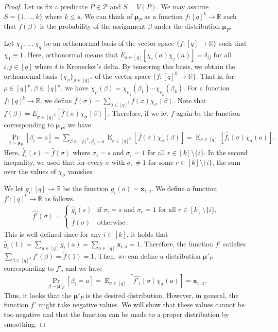 \documentclass[letterpaper, 11pt]{article}
\newcommand{\calP}{\mathcal{P}}
\newcommand{\bbR}{\mathbb{R}}
\newcommand{\bix}{\boldsymbol{x}}
\newcommand{\bimu}{\boldsymbol{\mu}}
\newcommand{\E}{\mathop{\mathrm{E}}}
\begin{document}
\begin{proof}
  Let us fix a predicate $P\in \calP$ and $S=V(P)$.
  We may assume $S=\{1,\ldots,k\}$ where $k\leq s$.
  We can think of $\bimu_P$ as a function $f:[q]^k\to \bbR$ such that $f(\beta)$ is the probability of the assignment $\beta$ under the distribution $\bimu_P$.

  Let $\chi_1,\ldots,\chi_q$ be an orthonormal basis of the vector space $\{f:[q]\to \bbR\}$ such that $\chi_1\equiv 1$.
  Here, orthonormal means that $E_{a\in[q]}[\chi_i(a)\chi_j(a)]=\delta_{ij}$ for all $i,j\in [q]$ where $\delta$ is Kronecker's delta.
  By tensoring this basis, 
  we obtain the orthonormal basis $\{\chi_\rho\}_{\rho\in[q]^k}$ of the vector space $\{f:[q]^k\to \bbR\}$.
  That is,
  for $\rho\in [q]^k, \beta\in [q]^k$,
  we have $\chi_{\rho}(\beta)=\chi_{\rho_1}(\beta_1)\cdots \chi_{\rho_k}(\beta_k)$.
  For a function $f:[q]^k\to \bbR$,
  we define $\hat{f}(\sigma)=\sum_{\beta\in [q]^k}f(x)\chi_{\sigma}(\beta)$.
  Note that $f(\beta)=E_{\sigma\in [q]^k}[\hat{f}(\sigma)\chi_{\sigma}(\beta)]$.
  Therefore, 
  if we let $f$ again be the function corresponding to $\bimu_P$, 
  we have
  \begin{eqnarray*}
    \Pr_{\beta\sim \bimu_P}[\beta_i=a]
    =
    \sum_{\beta\in [q]^k, \beta_i=a}\E_{\sigma\in [q]^k}\left[\widehat{f}(\sigma)\chi_\sigma(\beta)\right]
    =
    \E_{\sigma\in [q]}\left[\widehat{f_i}(\sigma)\chi_\sigma(a)\right].
  \end{eqnarray*}
  Here, $\widehat{f}_i(s)=\widehat{f}(\sigma)$ where $\sigma_i=s$ and $\sigma_r=1$ for all $r\in [k]\setminus\{i\}$.
  In the second inequality, we used that for every $\sigma$ with $\sigma_r\neq 1$ for some $r\in [k]\setminus\{i\}$,
  the sum over the values of $\chi_\sigma$ vanishes.

  We let $g_i:[q]\to \bbR$ be the function $g_i(a)=\bix_{i,a}$.
  We define a function $f':[q]^k\to \bbR$ as follows.
  \begin{eqnarray*}
    \widehat{f'}(\sigma)=\left\{
    \begin{array}{ll}
      \widehat{g}_i(s) & \mbox{if }\sigma_i=s\mbox{ and }\sigma_r=1\mbox{ for all }r\in [k]\setminus \{i\}, \\  
      \widehat{f}(\sigma) & \mbox{otherwise}.      
    \end{array}
    \right.
  \end{eqnarray*}
  This is well-defined since for any $i\in [k]$, 
  it holds that $\widehat{g}_i(1)=\sum_{a\in [q]}g_i(a)=\sum_{a\in [q]}\bix_{i,a}=1$.
  Therefore, the function $f'$ satisfies $\sum_{\beta\in [q]^k}f'(\beta)=\widehat{f}(1)=1$,
  Then, we can define a distribution $\bimu'_P$ corresponding to $f'$,
  and we have
  \begin{eqnarray*}
    \Pr_{\beta\sim \bimu'_P}[\beta_i=a]=\E_{\sigma\in [q]}\left[\widehat{f'_i}(\sigma)\chi_\sigma(a)\right]=\bix_{v,a}.
  \end{eqnarray*}
  Thus, it looks that the $\bimu'_P$ is the desired distribution.
  However, in general, 
  the function $f'$ might take negative values.
  We will show that these values cannot be too negative and that the function can be made to a proper distribution by smoothing.
  

\end{proof}
\end{document}
